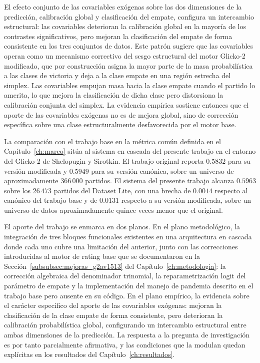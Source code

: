 El efecto conjunto de las covariables ex\'ogenas sobre las dos dimensiones de la predicci\'on, calibraci\'on global y clasificaci\'on del empate, configura un intercambio estructural: las covariables deterioran la calibraci\'on global en la mayor\'ia de los contrastes significativos, pero mejoran la clasificaci\'on del empate de forma consistente en los tres conjuntos de datos. Este patr\'on sugiere que las covariables operan como un mecanismo correctivo del sesgo estructural del motor Glicko-2 modificado, que por construcci\'on asigna la mayor parte de la masa probabil\'istica a las clases de victoria y deja a la clase empate en una regi\'on estrecha del simplex. Las covariables empujan masa hacia la clase empate cuando el partido lo amerita, lo que mejora la clasificaci\'on de dicha clase pero distorsiona la calibraci\'on conjunta del simplex. La evidencia emp\'irica sostiene entonces que el aporte de las covariables ex\'ogenas no es de mejora global, sino de correcci\'on espec\'ifica sobre una clase estructuralmente desfavorecida por el motor base.

La comparaci\'on con el trabajo base en la m\'etrica com\'un definida en el Cap\'itulo~\ref{ch:marco} sit\'ua al sistema en cascada del presente trabajo en el entorno del Glicko-2 de Shelopugin y Sirotkin. El trabajo original reporta $0.5832$ para su versi\'on modificada y $0.5949$ para su versi\'on can\'onica, sobre un universo de aproximadamente $366\,000$ partidos. El sistema del presente trabajo alcanza $0.5963$ sobre los $26\,473$ partidos del Dataset Lite, con una brecha de $0.0014$ respecto al can\'onico del trabajo base y de $0.0131$ respecto a su versi\'on modificada, sobre un universo de datos aproximadamente quince veces menor que el original.

El aporte del trabajo se enmarca en dos planos. En el plano metodol\'ogico, la integraci\'on de tres bloques funcionales existentes en una arquitectura en cascada donde cada uno cubre una limitaci\'on del anterior, junto con las correcciones introducidas al motor de rating base que se documentaron en la Secci\'on~\ref{subsubsec:mejoras_g2av1513} del Cap\'itulo~\ref{ch:metodologia}: la correcci\'on algebraica del denominador trinomial, la reparametrizaci\'on logit del par\'ametro de empate y la implementaci\'on del manejo de pandemia descrito en el trabajo base pero ausente en su c\'odigo. En el plano emp\'irico, la evidencia sobre el car\'acter espec\'ifico del aporte de las covariables ex\'ogenas: mejoran la clasificaci\'on de la clase empate de forma consistente, pero deterioran la calibraci\'on probabil\'istica global, configurando un intercambio estructural entre ambas dimensiones de la predicci\'on. La respuesta a la pregunta de investigaci\'on es por tanto parcialmente afirmativa, y las condiciones que la modulan quedan expl\'icitas en los resultados del Cap\'itulo~\ref{ch:resultados}.

